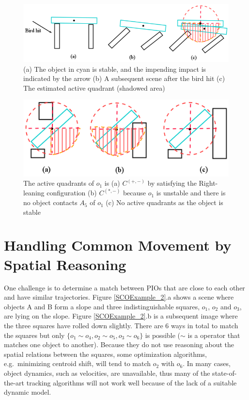 \documentclass[letterpaper]{article}
\begin{document}
\begin{figure}[t]
\centering\includegraphics[scale=0.28]{BirdImpact.png}
\vspace{-3mm}
\caption{(a) The object in cyan is stable, and the impending impact is indicated by the arrow (b) A subsequent scene after the bird hit (c) The estimated active quadrant (shadowed area)}
\label{BirdImpact}
\vspace{-3mm}
\end{figure}

\begin{figure}[t]
\centering\includegraphics[scale=0.35]{ScenarioByRules.png}
\vspace{-3mm}
\caption{ The active quadrants of $o_1$ is (a)  $C^{(+,-)}$ by satisfying the Right-leaning configuration (b) $C^{(*,-)}$ because $o_1$ is unstable and there is no object contacts $A_5$ of $o_1$ (c) No active quadrants as the object is stable}
\label{ScenarioByRules}
\vspace{-6mm}
\end{figure}
\vspace{-2mm}
\section{Handling Common Movement by Spatial Reasoning}
\label{CM}

One challenge is to determine a match between PIOs that are close to each other and have similar trajectories. Figure \ref{SCOExample_2}.a  shows a scene where objects A and B form a slope and three indistinguishable squares, $o_1$, $o_2$ and $o_3$, are lying on the slope. Figure \ref{SCOExample_2}.b is a subsequent image where the three squares have rolled down slightly. There are 6 ways in total to match the squares but only $\{o_1 \sim o_4, o_2 \sim o_5, o_3 \sim o_6\}$ is possible ($\sim$ is a operator that matches one object to another). Because they do not use reasoning about the spatial relations between the squares, some optimization algorithms, e.g.\ minimizing centroid shift, will tend to match $o_2$ with $o_6$. In many cases, object dynamics, such as velocities, are unavailable, thus many of the state-of-the-art tracking algorithms will not work well because of the lack of a suitable dynamic model. 
\end{document}

